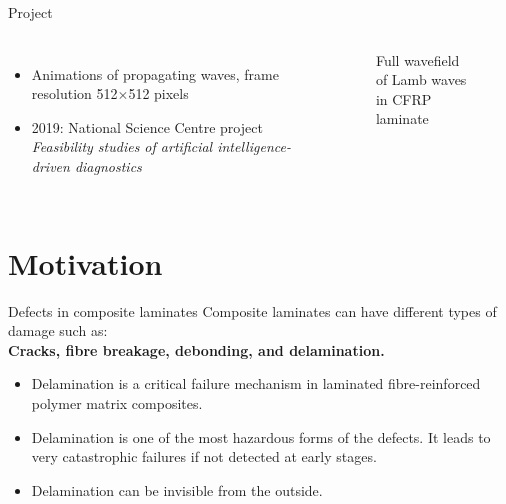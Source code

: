\documentclass[10pt,aspectratio=169,dvipsnames]{beamer} %
\begin{document}
\begin{frame}[t]{Project}
	\begin{columns}[T]
		\vspace{5mm}
		\begin{itemize}
			\item Animations of propagating waves, frame resolution 512$\times$512 pixels
			\item 2019: National Science Centre project \emph{Feasibility studies of artificial intelligence-driven diagnostics}
		\end{itemize}
			\begin{flushleft}
				\begin{figure}
					\hspace{1pt}\hspace{16mm}
					\caption{Full wavefield of Lamb waves in CFRP laminate}
				\end{figure}
			\end{flushleft}	
	\end{columns}
\end{frame}
\section{Motivation}
\begin{frame}{Defects in composite laminates}
	\small
	Composite laminates can have different types of damage such as: \\
	\textbf{Cracks, fibre breakage, debonding, and \alert{delamination}.} \\ 
	\begin{minipage}[c]{0.45\textwidth}
		\begin{itemize}
			\footnotesize
			\item Delamination is a critical failure mechanism in laminated fibre-reinforced polymer matrix composites.
			\item Delamination is one of the most hazardous forms of the defects. 
			It leads to very catastrophic failures if not detected at early stages.
			\item Delamination can be invisible from the outside.
		\end{itemize}
	\end{minipage}
	\hfill
	\begin{minipage}[c]{0.45\textwidth}
		\begin{figure}
		\end{figure}
	\end{minipage}
\end{frame}
\end{document}
